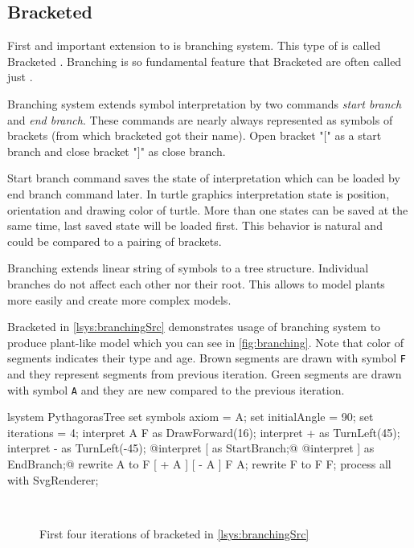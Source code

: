 \subsection{Bracketed \lsystems}

First and important extension to \dzerolsystem is branching system.
This type of \lsystem is called Bracketed \lsystem\cite{PL91}.
Branching is so fundamental feature that Bracketed \lsystems are often called just \lsystems.

Branching system extends symbol interpretation by two commands \emph{start branch} and \emph{end branch}.
These commands are nearly always represented as symbols of brackets (from which bracketed \lsystems got their name).
Open bracket "$[$" as a start branch and close bracket "$]$" as close branch.

Start branch command saves the state of interpretation which can be loaded by end branch command later.
In turtle graphics interpretation state is position, orientation and drawing color of turtle.
More than one states can be saved at the same time, last saved state will be loaded first.
This behavior is natural and could be compared to a pairing of brackets.

Branching extends linear string of symbols to a tree structure.
Individual branches do not affect each other nor their root.
This allows to model plants more easily and create more complex models.

Bracketed \lsystem in \autoref{lsys:branchingSrc} demonstrates usage of branching system to produce plant-like model which you can see in \autoref{fig:branching}.
Note that color of segments indicates their type and age.
Brown segments are drawn with symbol \texttt{F} and they represent segments from previous iteration.
Green segments are drawn with symbol \texttt{A} and they are new compared to the previous iteration.

\begin{Lsystem}[label=lsys:branchingSrc,caption={Bracketed \lsystem which creates plant-like model (\autoref{fig:branching})}]
lsystem PythagorasTree {
	set symbols axiom = A;
	set initialAngle = 90;
	set iterations = 4;	
	interpret A F as DrawForward(16);
	interpret + as TurnLeft(45);
	interpret - as TurnLeft(-45);
	@interpret [ as StartBranch;@
	@interpret ] as EndBranch;@
	rewrite A to F [ + A ] [ - A ] F A;
	rewrite F to F F;
}
process all with SvgRenderer;
\end{Lsystem}

\begin{figure}[h]
	\centering
	 ~
	 ~
	 ~
	\caption{First four iterations of bracketed \lsystem in \autoref{lsys:branchingSrc}}
	\label{fig:branching}
\end{figure}



